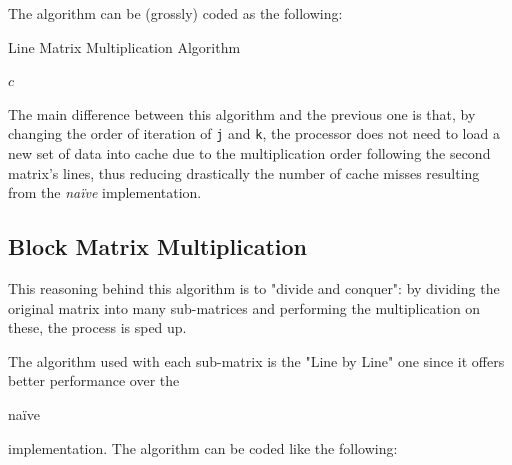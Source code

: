 \documentclass[11pt,a4paper]{article}
\begin{document}
The algorithm can be (grossly) coded as the following:
\begin{algorithm}[H]
    \caption{Line Matrix Multiplication Algorithm}
    \begin{algorithmic}[1]
                    \EndFor
                \EndFor
            \EndFor
            \State \Return $c$
        \EndFunction
    \end{algorithmic}
\end{algorithm}

The main difference between this algorithm and the previous one is that, by changing the order of iteration of \lstinline{j} and \lstinline{k}, the processor does not need to load a new set of data into cache due to the multiplication order following the second matrix's lines, thus reducing drastically the number of cache misses resulting from the \emph{naïve} implementation.

\subsection{Block Matrix Multiplication}

This reasoning behind this algorithm is to "divide and conquer": by dividing the original matrix into many sub-matrices and performing the multiplication on these, the process is sped up. 

The algorithm used with each sub-matrix is the "Line by Line" one since it offers better performance over the \begin{em}naïve\end{em} implementation. The algorithm can be coded like the following:
\end{document}
